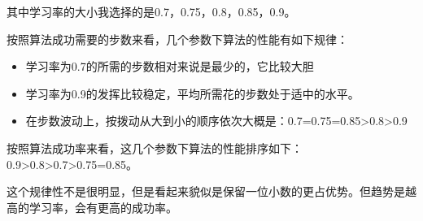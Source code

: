 \documentclass{article}
\begin{document}
\begin{itemize}
其中学习率的大小我选择的是0.7，0.75，0.8，0.85，0.9。

按照算法成功需要的步数来看，几个参数下算法的性能有如下规律：
\begin{itemize}
\item 学习率为0.7的所需的步数相对来说是最少的，它比较大胆
\item 学习率为0.9的发挥比较稳定，平均所需花的步数处于适中的水平。
\item 在步数波动上，按拨动从大到小的顺序依次大概是：0.7=0.75=0.85>0.8>0.9
\end{itemize}

按照算法成功率来看，这几个参数下算法的性能排序如下：0.9>0.8>0.7>0.75=0.85。

这个规律性不是很明显，但是看起来貌似是保留一位小数的更占优势。但趋势是越高的学习率，会有更高的成功率。
\end{itemize}
\end{document}
